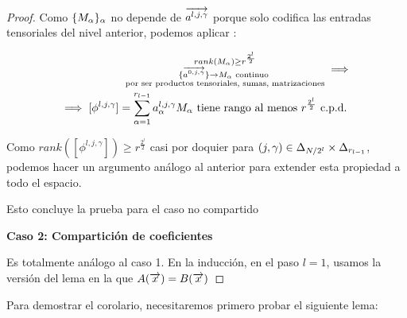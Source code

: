 \begin{proof}
    Como $\{ M_\alpha \}_\alpha$ no depende de $\overrightarrow{a^{l, j, \gamma}}$ porque solo codifica las entradas tensoriales del nivel anterior, podemos aplicar :

    \begin{equation}
    \begin{split}
        \substack{
            rank(M_\alpha) \geq r^{\frac{2^l}{2}}\\
            \{ \overrightarrow{a^{0, j, \gamma}} \} \to M_\alpha \text{ continuo } \\
            \text{por ser productos tensoriales, sumas, matrizaciones}
        } \implies \\
        \implies [\phi^{l, j, \gamma}] = \sum_{\alpha = 1}^{r_{l-1}} a_\alpha^{l,j,\gamma} M_\alpha \text{ tiene rango al menos } r^{\frac{2^l}{2}} \text{ c.p.d. }
    \end{split}
    \end{equation}

    Como $rank([\phi^{l, j, \gamma}]) \geq r^{\frac{2^l}{2}}$ casi por doquier para $(j, \gamma) \in \Delta_{N/2^l} \times \Delta_{r_{l-1}}$, podemos hacer un argumento análogo al anterior para extender esta propiedad a todo el espacio.

    Esto concluye la prueba para el caso no compartido

    \textbf{Caso 2: Compartición de coeficientes}

    Es totalmente análogo al caso 1. En la inducción, en el paso $l = 1$, usamos la versión del lema  en la que $A(\overrightarrow{x}) = B(\overrightarrow{x})$
\end{proof}

Para demostrar el corolario, necesitaremos primero probar el siguiente lema:

